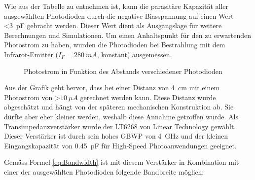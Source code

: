 Wie aus der Tabelle zu entnehmen ist, kann die parasitäre Kapazität aller ausgewählten Photodioden durch die negative Biasspannung auf einen Wert \textless \SI{3}{pF} gebracht werden. Dieser Wert dient als Ausgangslage für weitere Berechnungen und Simulationen.
\newline
Um einen Anhaltspunkt für den zu erwartenden Photostrom zu haben, wurden die Photodioden bei Bestrahlung mit dem Infrarot-Emitter ($I_{F}=\SI{280}{mA}$, konstant) ausgemessen.

\begin{figure}[h]
\centering
{}
\caption{Photostrom in Funktion des Abstands verschiedener Photodioden}\label{fig:Plot_Photo}
\end{figure}

Aus der Grafik geht hervor, dass bei einer Distanz von \SI{4}{cm} mit einem Photostrom von \textgreater $\SI{10}{\mu A}$ gerechnet werden kann. Diese Distanz wurde abgeschätzt und hängt von der späteren mechanischen Konstruktion ab. Sie dürfte aber eher kleiner werden, weshalb diese Annahme getroffen wurde.
\newline
Als Transimpedanzverstärker wurde der LT6268 von Linear Technology gewählt. Dieser Verstärker ist durch sein hohes GBWP von \SI{4}{GHz} und der kleinen Eingangskapazität von \SI{0.45}{pF} für High-Speed Photoanwendungen geeignet.

Gemäss Formel \ref{eq:Bandwidth} ist mit diesem Verstärker in Kombination mit einer der ausgewählten Photodioden folgende Bandbreite möglich:

